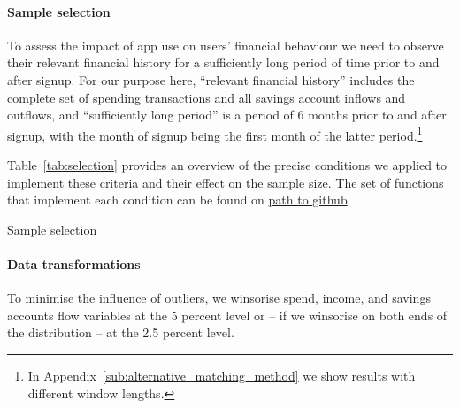 \paragraph{Sample selection}%
\label{par:sample_selection}

To assess the impact of app use on users' financial behaviour we need to
observe their relevant financial history for a sufficiently long period of time
prior to and after signup. For our purpose here, ``relevant
financial history'' includes the complete set of spending transactions and all
savings account inflows and outflows, and ``sufficiently long period'' is a
period of 6 months prior to and after signup, with the month of signup being
the first month of the latter period.\footnote{In
Appendix~\ref{sub:alternative_matching_method} we show results with different
window lengths. }

Table~\ref{tab:selection} provides an overview of the precise conditions we applied to implement
these criteria and their effect on the sample size. The set of functions that
implement each condition can be found on \href{path-to-github}{path to github}.

\begin{table}
\centering
\caption{Sample selection}\label{tab:selection}

\end{table}

\paragraph{Data transformations}%
\label{par:data_transformations}

To minimise the influence of outliers, we winsorise spend, income, and savings
accounts flow variables at the 5 percent level or -- if we winsorise on both
ends of the distribution -- at the 2.5 percent level.






